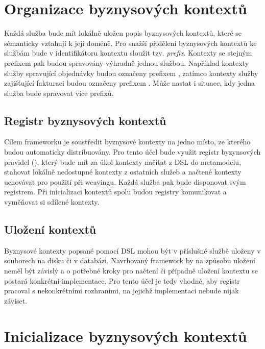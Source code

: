\section{Organizace byznysových kontextů}

Každá služba bude mít lokálně uložen popis byznysových kontextů, které se sémanticky vztahují
k její doméně. Pro snažší přidělení byznysových kontextů ke službám bude v identifikátoru kontextu sloužit
tzv. \textit{prefix}. Kontexty se stejným prefixem pak budou spravovány výhradně jednou službou. Například kontexty
služby spravující objednávky budou označeny prefixem , zatímco kontexty služby zajišťující fakturaci budou
označeny prefixem . Může nastat i situace, kdy jedna služba bude spravovat více prefixů.

\subsection{Registr byznysových kontextů}

Cílem frameworku je soustředit byznysové kontexty na jedno místo, ze kterého budou
automaticky distribuovány. Pro tento účel bude využit registr byzynsových pravidel
(), který bude mít za úkol kontexty načítat z \gls{DSL} do metamodelu,
stahovat lokálně nedostupné kontexty z ostatních služeb a načtené kontexty uchovávat pro použití při weavingu.
Každá služba pak bude disponovat svým registrem. Při inicializaci kontextů spolu budou registry komunikovat
a vyměňovat si sdílené kontexty.

\subsection{Uložení kontextů}

Byznysové kontexty popsané pomocí \gls{DSL} mohou být v příslušné službě uloženy v souborech na disku či v
databázi. Navrhovaný framework by na způsobu uložení neměl být závislý a o potřebné kroky
pro načtení či případně uložení kontextu se postará konkrétní implementace. Pro tento účel
je tedy vhodné, aby registr pracoval s nekonkrétními rozhraními, na jejichž implementaci
nebude nijak záviset.

\section{Inicializace byznysových kontextů}

